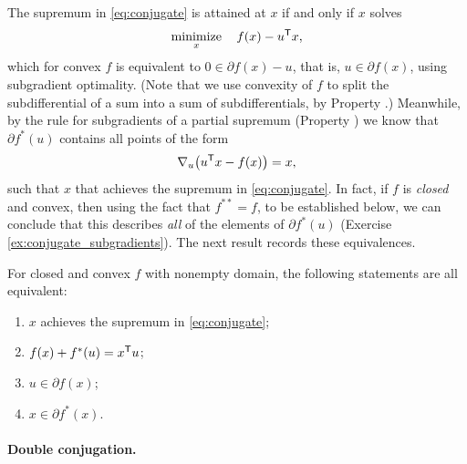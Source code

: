 The supremum in \eqref{eq:conjugate} is attained at $x$ if and only if $x$
solves  
\[
\operatorname*{minimize}_x \quad f(x) - u^{\mathsf{T}} x,
\]
which for convex $f$ is equivalent to $0 \in \partial f(x) - u$, that is, $u \in 
\partial f(x)$, using subgradient optimality. (Note that we use convexity 
of $f$ to split the subdifferential of a sum into a sum of subdifferentials, by 
Property .)  Meanwhile, by the rule for subgradients
of a partial supremum (Property ) we know that
$\partial f^*(u)$ contains all points of the form 
\[
\nabla_u \big( u^{\mathsf{T}} x - f(x) \big) = x,
\]
such that $x$ that achieves the supremum in \eqref{eq:conjugate}. In fact, if
$f$ is \emph{closed} and convex, then using the fact that $f^{**} = f$, to be 
established below, we can conclude that this describes \emph{all} of the
elements of $\partial f^*(u)$ (Exercise \ref{ex:conjugate_subgradients}). The 
next result records these equivalences. 

\begin{Theorem}
For closed and convex $f$ with nonempty domain, the following statements are all 
equivalent:
\begin{enumerate}[label=(\roman*)]
\item $x$ achieves the supremum in \eqref{eq:conjugate};
\item $f(x) + f^*(u) = x^{\mathsf{T}} u$;
\item $u \in \partial f(x)$;
\item $x \in \partial f^*(x)$.
\end{enumerate}
\end{Theorem}
\vspace{-3pt}

\paragraph{Double conjugation.}

